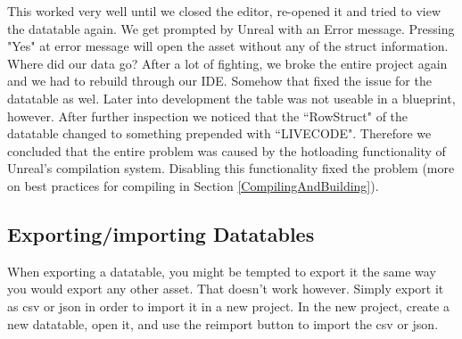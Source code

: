 \documentclass{uva-inf-article}
\begin{document}
This worked very well until we closed the editor, re-opened it and tried to view the datatable again. We get prompted by Unreal with an Error message. Pressing "Yes" at error message will open the asset without any of the struct information. Where did our data go? After a lot of fighting, we broke the entire project again and we had to rebuild through our IDE. Somehow that fixed the issue for the datatable as wel. Later into development the table was not useable in a blueprint, however. After further inspection we noticed that the ``RowStruct" of the datatable changed to something prepended with ``LIVECODE". Therefore we concluded that the entire problem was caused by the hotloading functionality of Unreal's compilation system. Disabling this functionality fixed the problem (more on best practices for compiling in Section \ref{CompilingAndBuilding}).

\subsection{Exporting/importing Datatables}
When exporting a datatable, you might be tempted to export it the same way you would export any other asset. That doesn't work however. Simply export it as csv or json in order to import it in a new project. In the new project, create a new datatable, open it, and use the reimport button to import the csv or json.


\printbibliography



\end{document}
